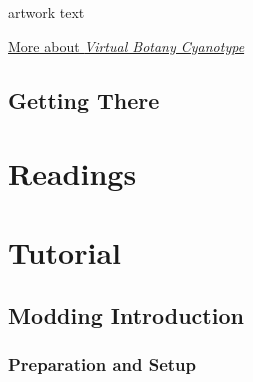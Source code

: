 \documentclass[
  openany]{book}
\begin{document}
artwork text

\href{http://www.alanbutler.info/virtual-botany-cyanotypes}{More about \emph{Virtual Botany Cyanotype}}

\hypertarget{getting-there-6}{%
\subsection*{Getting There}\label{getting-there-6}}

\hypertarget{readings-3}{%
\section*{Readings}\label{readings-3}}

\hypertarget{tutorial-3}{%
\section*{Tutorial}\label{tutorial-3}}

\hypertarget{modding-introduction}{%
\subsection*{Modding Introduction}\label{modding-introduction}}

\hypertarget{preparation-and-setup}{%
\subsubsection*{Preparation and Setup}\label{preparation-and-setup}}
\end{document}
